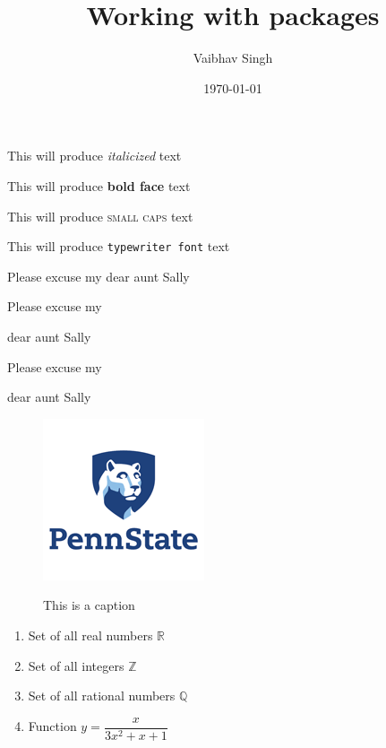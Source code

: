 \documentclass[10pt, letterpaper]{article}
\title{Working with packages}
\author{Vaibhav Singh}
\date{\today}
\def\eq1{y=\dfrac{x}{3x^2 + x + 1}}
\newcommand{\set}[1]{\setlength\itemsep{#1em}}
\begin{document}
\maketitle

This will produce \textit{italicized} text

This will produce \textbf{bold face} text

This will produce \textsc{small caps} text

This will produce \texttt{typewriter font} text


\vspace{1cm}
Please excuse my dear aunt Sally

Please excuse my \begin{large}dear aunt Sally\end{large}

Please excuse my \begin{Large}dear aunt Sally\end{Large}


\begin{figure}[H]
\centering
\includegraphics[width=0.4 \textwidth]{pennstate}\\
\caption{This is a caption}
\end{figure}


\begin{enumerate}
\set{1.2}
\item Set of all real numbers $\mathbb{R}$
\item Set of all integers $\mathbb{Z}$
\item Set of all rational numbers $\mathbb{Q}$
\item Function $\eq1$


\end{enumerate}
\end{document}
